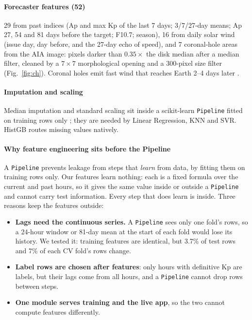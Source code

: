 \documentclass[conference,a4paper]{IEEEtran}
\newcommand{\code}[1]{\texttt{\footnotesize #1}}
\begin{document}
\paragraph{Forecaster features (52)} 29 from past indices (Ap and max Kp of the last 7 days; 3/7/27-day means; Ap
27, 54 and 81 days before the target; F10.7; season), 16 from daily solar wind (issue day, day before, and the
27-day echo of speed), and 7 coronal-hole areas from the AIA image: pixels darker than $0.35\times$ the disk median
after a median filter, cleaned by a $7\times7$ morphological opening and a 300-pixel size filter
(Fig.~\ref{fig:ch}). Coronal holes emit fast wind that reaches Earth 2--4 days later \cite{vrsnak2007}.

\paragraph{Imputation and scaling} Median imputation and standard scaling sit inside a scikit-learn
\code{Pipeline} fitted on training rows only \cite{pedregosa2011}; they are needed by Linear Regression, KNN and
SVR. HistGB routes missing values natively.

\paragraph{Why feature engineering sits before the Pipeline} A \code{Pipeline} prevents leakage from steps that
\emph{learn} from data, by fitting them on training rows only. Our features learn nothing: each is a fixed formula
over the current and past hours, so it gives the same value inside or outside a \code{Pipeline} and cannot carry
test information. Every step that does learn is inside. Three reasons keep the features outside:
\begin{itemize}
\item \textbf{Lags need the continuous series.} A \code{Pipeline} sees only one fold's rows, so a 24-hour window or
81-day mean at the start of each fold would lose its history. We tested it: training features are identical, but
3.7\% of test rows and 7\% of each CV fold's rows change.
\item \textbf{Label rows are chosen after features}: only hours with definitive Kp are labels, but their lags come
from all hours, and a \code{Pipeline} cannot drop rows between steps.
\item \textbf{One module serves training and the live app}, so the two cannot compute features differently.
\end{itemize}
\end{document}
